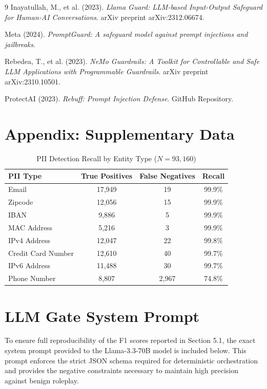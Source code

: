 \documentclass[12pt,a4paper]{article}
\begin{document}
\begin{thebibliography}{9}
Inayatullah, M., et al. (2023). \textit{Llama Guard: LLM-based Input-Output Safeguard for Human-AI Conversations}. arXiv preprint arXiv:2312.06674.

Meta (2024). \textit{PromptGuard: A safeguard model against prompt injections and jailbreaks}.

Rebedea, T., et al. (2023). \textit{NeMo Guardrails: A Toolkit for Controllable and Safe LLM Applications with Programmable Guardrails}. arXiv preprint arXiv:2310.10501.

ProtectAI (2023). \textit{Rebuff: Prompt Injection Defense}. GitHub Repository.
\end{thebibliography}

\appendix
\section{Appendix: Supplementary Data}

\begin{table}[H]
\centering
\caption{PII Detection Recall by Entity Type ($N=93{,}160$)}
\label{tab:pii_appendix}
\begin{tabular}{@{}lccc@{}}
\toprule
\textbf{PII Type} & \textbf{True Positives} & \textbf{False Negatives} & \textbf{Recall} \\
\midrule
Email & 17,949 & 19 & 99.9\% \\
Zipcode & 12,056 & 15 & 99.9\% \\
IBAN & 9,886 & 5 & 99.9\% \\
MAC Address & 5,216 & 3 & 99.9\% \\
IPv4 Address & 12,047 & 22 & 99.8\% \\
Credit Card Number & 12,610 & 40 & 99.7\% \\
IPv6 Address & 11,488 & 30 & 99.7\% \\
Phone Number & 8,807 & 2,967 & 74.8\% \\
\bottomrule
\end{tabular}
\end{table}

\newpage
\appendix
\section{LLM Gate System Prompt}
\label{app:system_prompt}

To ensure full reproducibility of the F1 scores reported in Section 5.1, the exact system prompt provided to the Llama-3.3-70B model is included below. This prompt enforces the strict JSON schema required for deterministic orchestration and provides the negative constraints necessary to maintain high precision against benign roleplay.
\end{document}
